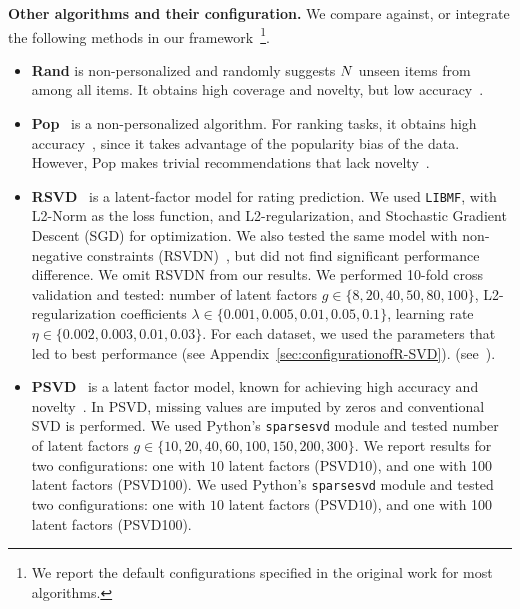 \vspace{4mm}
\noindent \textbf{Other algorithms and their configuration. } We compare against, or integrate the following methods  in our framework~\footnote{We report the default configurations specified in the original work for most algorithms.}.
\begin{itemize}

\item \textbf{Rand} is  non-personalized and randomly suggests $N$ unseen items from among all items.  It obtains high coverage and novelty,  but low accuracy~\cite{vargas2014improving}. 

\item \textbf{Pop}~\cite{cremonesi2010performance} is a non-personalized  algorithm. For  ranking tasks, it obtains high accuracy~\cite{cremonesi2010performance,vargas2014improving}, since it takes advantage of the popularity bias of the data. However, Pop makes trivial recommendations that lack novelty~\cite{cremonesi2010performance}.  

\item \textbf{RSVD}~\cite{koren2009matrix} is a latent-factor model for  rating prediction. We used \texttt{LIBMF}, with  L2-Norm as the loss function, and L2-regularization,  and Stochastic Gradient Descent (SGD) for optimization. We also tested the same model with non-negative constraints (RSVDN)~\cite{zhuang2013fast}, but did not find significant performance difference. We omit RSVDN from our results.  We performed 10-fold cross validation and tested:  number of latent factors  $g \in \{8,  20, 40, 50, 80, 100\}$, L2-regularization coefficients  $\lambda \in \{0.001, 0.005, 0.01, 0.05, 0.1\}$,  learning rate $\eta \in \{0.002,0.003,0.01, 0.03\}$. For each dataset, we used the parameters that led to best performance  
\iffullpaper
 (see Appendix~\ref{sec:configurationofR-SVD}).
\else
(see~\cite{ourFullVersion}).
\fi

\item \textbf{PSVD}~\cite{cremonesi2010performance} is a latent factor model,  known for  achieving high accuracy and novelty~\cite{cremonesi2010performance}. In PSVD,  missing values are imputed by zeros and conventional SVD is performed.  
\iffullpaper
 We used Python's \texttt{sparsesvd}  module and tested number of latent factors $g \in \{10, 20, 40, 60, 100, 150, 200, 300\}$. We report results for two configurations:  one with $10$ latent factors (PSVD10), and one with 100 latent factors (PSVD100). 
\else
We used Python's \texttt{sparsesvd}  module and tested two configurations:  one with $10$ latent factors (PSVD10), and one with 100 latent factors (PSVD100). 
\fi  


\end{itemize}
